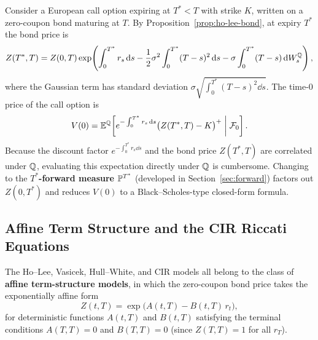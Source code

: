 \begin{example}\label{ex:zcb-call}
    Consider a European call option expiring at $T^* < T$ with strike $K$, written on a zero-coupon bond maturing at $T$. By Proposition~\ref{prop:ho-lee-bond}, at expiry $T^*$ the bond price is
    \[
    Z(T^*, T) = Z(0, T)\exp\!\left(\int_0^{T^*} r_s\,\mathrm{d} s - \frac{1}{2}\sigma^2 \int_0^{T^*} (T - s)^2\,\mathrm{d} s - \sigma\int_0^{T^*} (T - s)\,\mathrm{d} W_s^{\mathbb{Q}}\right),
    \]
    where the Gaussian term has standard deviation $\sigma\sqrt{\int_0^{T^*} (T - s)^2\dd s}$. The time-$0$ price of the call option is
    \[
    V(0) = \mathbb{E}^{\mathbb{Q}}\!\left[e^{-\int_0^{T^*} r_s\,\mathrm{d} s}\bigl(Z(T^*, T) - K\bigr)^+ \;\middle|\; \mathcal{F}_0\right].
    \]
    Because the discount factor $e^{-\int_0^{T^*} r_s\dd s}$ and the bond price $Z(T^*, T)$ are correlated under $\mathbb{Q}$, evaluating this expectation directly under $\mathbb{Q}$ is cumbersome. Changing to the \textbf{$T^*$-forward measure} $\mathbb{P}^{T^*}$ (developed in Section~\ref{sec:forward}) factors out $Z(0, T^*)$ and reduces $V(0)$ to a Black--Scholes-type closed-form formula.
\end{example}

\subsection*{Affine Term Structure and the CIR Riccati Equations}
The Ho--Lee, Vasicek, Hull--White, and CIR models all belong to the class of \textbf{affine term-structure models}, in which the zero-coupon bond price takes the exponentially affine form
\begin{equation}\label{eq:affine-zcb}
Z(t, T) = \exp\!\bigl(A(t, T) - B(t, T)\,r_t\bigr),
\end{equation}
for deterministic functions $A(t, T)$ and $B(t, T)$ satisfying the terminal conditions $A(T, T) = 0$ and $B(T, T) = 0$ (since $Z(T, T) = 1$ for all $r_T$).

